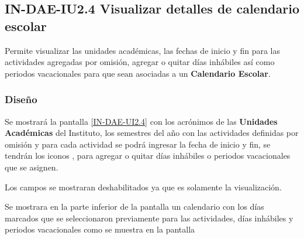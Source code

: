\subsection{IN-DAE-IU2.4 Visualizar detalles de calendario escolar }

	Permite visualizar las unidades académicas, las fechas de inicio y fin para las actividades agregadas por omisión, agregar o quitar días inhábiles así como periodos vacacionales para que sean asociadas a un \textbf{Calendario Escolar}. 

\subsubsection{Diseño}

Se mostrará la pantalla \ref{IN-DAE-UI2.4} con los acrónimos de las \textbf{Unidades Académicas} del Instituto, los semestres del año con las actividades definidas por omisión y para cada actividad se podrá ingresar la fecha de inicio y fin, se tendrán los iconos \IUAdd, \IUMenos para agregar o quitar días inhábiles o periodos vacacionales que se asignen.

Los campos se mostraran deshabilitados ya que es solamente la visualización.  



Se mostrara en la parte inferior de la pantalla un calendario con los días marcados que se seleccionaron previamente para las actividades, días inhábiles y periodos vacacionales como se muestra en la pantalla 




